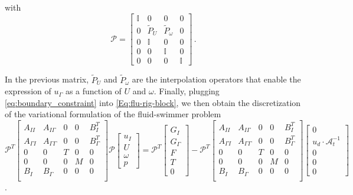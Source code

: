 \documentclass[graybox]{svmult}
\newcommand{\Alemap}{\mathcal{A}} %
\newcommand{\Vel}{u} %
\newcommand{\Pres}{p} %
\newcommand{\tvel}{U} %
\newcommand{\angvel}{\omega} %
\begin{document}
with 
\begin{equation*}
	\mathcal{P} =
	\begin{bmatrix}
		\mathbb{I} &  0 & 0 & 0\\
		0 &\tilde{P}_\tvel & \tilde{P}_\angvel & 0\\
		0 &\mathbb{I} & 0 & 0\\
		0 &0 & \mathbb{I} & 0\\
		0 &0& 0& \mathbb{I}
	\end{bmatrix}\,.
\end{equation*}

In the previous matrix, $\tilde{P}_\tvel$ and $ \tilde{P}_\angvel$ are the interpolation operators that enable the expression of $u_\Gamma$ as a function of $\tvel$ and $\angvel$. 
Finally, plugging \eqref{eq:boundary_constraint} into \eqref{Eq:flu-rig-block}, we then obtain the discretization of the variational formulation of the fluid-swimmer problem %
\begin{equation*}
	\mathcal{P}^T \begin{bmatrix}
		A_{II} & A_{I\Gamma} & 0 & 0 & B_{I}^T  \\
		A_{\Gamma I} & A_{\Gamma \Gamma}  & 0 & 0 & B_{\Gamma}^T\\
		0 & 0 & T & 0 & 0 \\
		0 & 0 & 0& M 
		& 0\\
		B_I & B_\Gamma & 0 & 0 & 0   \\
	\end{bmatrix} \mathcal{P} \begin{bmatrix}
		\Vel_I \\ \tvel \\ \angvel \\ \Pres 
	\end{bmatrix}  
 = 
 \mathcal{P}^T 	
 \begin{bmatrix}
		G_I \\
		G_{\Gamma}\\
		F
		\\
		T
		\\
		0
	\end{bmatrix} - \mathcal{P}^T \begin{bmatrix}
		A_{II} & A_{I\Gamma} & 0 & 0 & B_{I}^T  \\
		A_{\Gamma I} & A_{\Gamma \Gamma}  & 0 & 0 & B_{\Gamma}^T\\
		0 & 0 & T & 0 & 0 \\
		0 & 0 & 0& M 
		& 0\\
		B_I & B_\Gamma & 0 & 0 & 0   \\
	\end{bmatrix}\begin{bmatrix}
		0 \\
		u_d \cdot \Alemap^{-1}_t\\
		0
		\\
		0
		\\
		0
	\end{bmatrix}
\end{equation*}.
\color{black}
\end{document}
